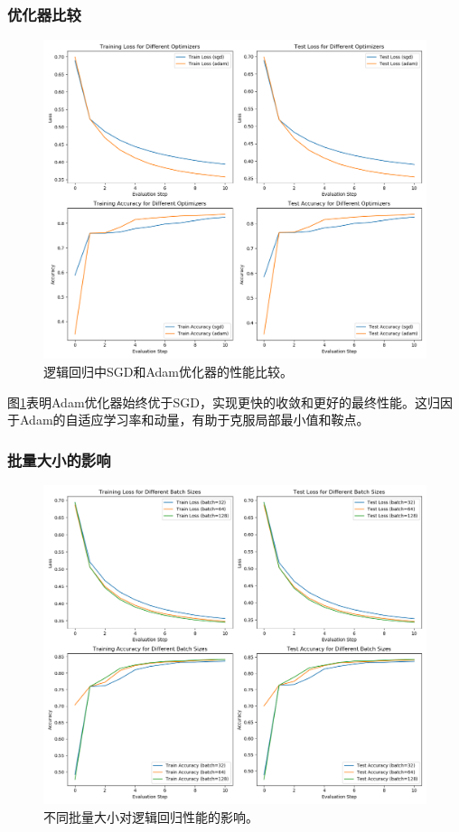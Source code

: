 \documentclass[journal, a4paper]{IEEEtran}
\begin{document}
\begin{CJK}{UTF8}{gbsn}
\subsubsection{优化器比较}
\begin{figure}[htbp]
\centering
\includegraphics[width=\linewidth]{logistic_regression_optimizers.png}
\caption{逻辑回归中SGD和Adam优化器的性能比较。}
\label{fig:lr_opt}
\end{figure}

图\ref{fig:lr_opt}表明Adam优化器始终优于SGD，实现更快的收敛和更好的最终性能。这归因于Adam的自适应学习率和动量，有助于克服局部最小值和鞍点。

\subsubsection{批量大小的影响}
\begin{figure}[htbp]
\centering
\includegraphics[width=\linewidth]{logistic_regression_batch_sizes.png}
\caption{不同批量大小对逻辑回归性能的影响。}
\label{fig:lr_batch}
\end{figure}


\end{CJK}
\end{document}
